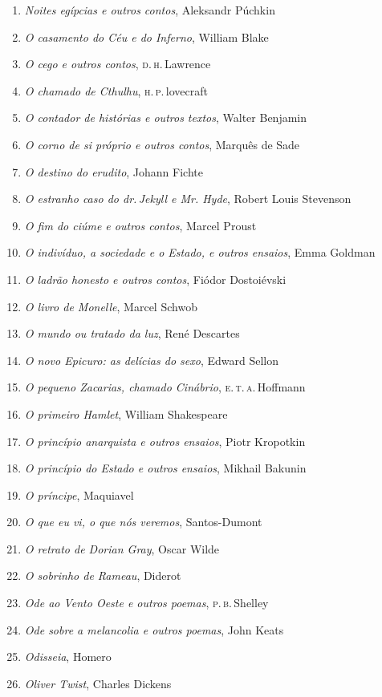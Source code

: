 \begin{enumerate}
\item \textit{Noites egípcias e outros contos}, Aleksandr Púchkin
\item \textit{O casamento do Céu e do Inferno}, William Blake
\item \textit{O cego e outros contos}, \textsc{d.\,h}.\,Lawrence
\item \textit{O chamado de Cthulhu}, \textsc{h.\,p.}\,lovecraft
\item \textit{O contador de histórias e outros textos}, Walter Benjamin
\item \textit{O corno de si próprio e outros contos}, Marquês de Sade
\item \textit{O destino do erudito}, Johann Fichte
\item \textit{O estranho caso do dr.\,Jekyll e Mr. Hyde}, Robert Louis Stevenson
\item \textit{O fim do ciúme e outros contos}, Marcel Proust
\item \textit{O indivíduo, a sociedade e o Estado, e outros ensaios}, Emma Goldman
\item \textit{O ladrão honesto e outros contos}, Fiódor Dostoiévski
\item \textit{O livro de Monelle}, Marcel Schwob
\item \textit{O mundo ou tratado da luz}, René Descartes
\item \textit{O novo Epicuro: as delícias do sexo}, Edward Sellon
\item \textit{O pequeno Zacarias, chamado Cinábrio}, \textsc{e.\,t.\,a.}\,Hoffmann
\item \textit{O primeiro Hamlet}, William Shakespeare
\item \textit{O princípio anarquista e outros ensaios}, Piotr Kropotkin
\item \textit{O princípio do Estado e outros ensaios}, Mikhail Bakunin
\item \textit{O príncipe}, Maquiavel
\item \textit{O que eu vi, o que nós veremos}, Santos-Dumont
\item \textit{O retrato de Dorian Gray}, Oscar Wilde
\item \textit{O sobrinho de Rameau}, Diderot
\item \textit{Ode ao Vento Oeste e outros poemas}, \textsc{p.\,b.}\,Shelley
\item \textit{Ode sobre a melancolia e outros poemas}, John Keats
\item \textit{Odisseia}, Homero
\item \textit{Oliver Twist}, Charles Dickens

\end{enumerate}
